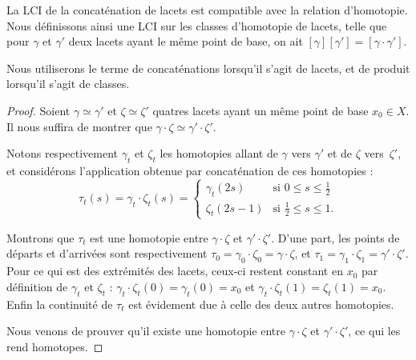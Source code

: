 \begin{proposition}
La LCI de la concaténation de lacets est compatible avec la relation d'homotopie. Nous définissons ainsi une LCI sur les classes d'homotopie de lacets, telle que pour $\gamma$ et $\gamma'$ deux lacets ayant le même point de base, on ait $[\gamma][\gamma']=[\gamma\cdot\gamma']$.
\end{proposition}


Nous utiliserons le terme de concaténations lorsqu'il s'agit de lacets, et de produit lorsqu'il s'agit de classes.


\begin{proof}
Soient $\gamma\simeq\gamma'$ et $\zeta\simeq\zeta'$ quatres lacets ayant un même point de base $x_0\in X$. Il nous suffira de montrer que $\gamma\cdot\zeta\simeq\gamma'\cdot\zeta'$.

Notons respectivement $\gamma_t$ et $\zeta_t$ les homotopies allant de $\gamma$ vers $\gamma'$ et de $\zeta$ vers~$\zeta'$, et considérons l'application obtenue par concaténation de ces homotopies : \begin{equation}\label{eq:homotopy-concatenate}
\tau_t(s)=\gamma_t\cdot\zeta_t(s)=\left\{\begin{matrix}
\gamma_t(2s)&\text{si }0\leq s\leq \frac{1}{2}\\ 
\zeta_t(2s-1)&\text{si }\frac{1}{2}\leq s\leq 1.
\end{matrix}\right.
\end{equation}

Montrons que $\tau_t$ est une homotopie entre $\gamma\cdot\zeta$ et $\gamma'\cdot\zeta'$. D'une part, les points de départs et d'arrivées sont respectivement $\tau_0=\gamma_0\cdot\zeta_0=\gamma\cdot\zeta$, et $\tau_1=\gamma_1\cdot\zeta_1=\gamma'\cdot\zeta'$. Pour ce qui est des extrémités des lacets, ceux-ci restent constant en $x_0$ par définition de $\gamma_t$ et $\zeta_t$ : $\gamma_t\cdot\zeta_t(0)=\gamma_t(0)=x_0$ et $\gamma_t\cdot\zeta_t(1)=\zeta_t(1)=x_0$. Enfin la continuité de $\tau_t$ est évidement due à celle des deux autres homotopies.

Nous venons de prouver qu'il existe une homotopie entre $\gamma\cdot\zeta$ et $\gamma'\cdot\zeta'$, ce qui les rend homotopes.
\end{proof}

